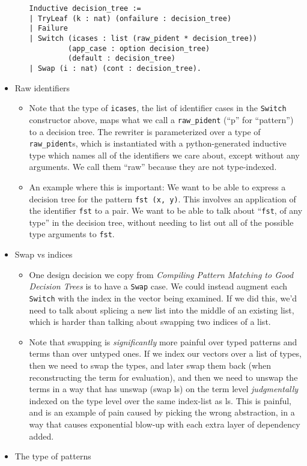 \begin{itemize}
\begin{itemize}
\begin{verbatim}
Inductive decision_tree :=
| TryLeaf (k : nat) (onfailure : decision_tree)
| Failure
| Switch (icases : list (raw_pident * decision_tree))
         (app_case : option decision_tree)
         (default : decision_tree)
| Swap (i : nat) (cont : decision_tree).
\end{verbatim}
  \end{itemize}
\item
  Raw identifiers

  \begin{itemize}
  \tightlist
  \item
    Note that the type of \texttt{icases}, the list of identifier cases
    in the \texttt{Switch} constructor above, maps what we call a
    \texttt{raw\_pident} (``p'' for ``pattern'') to a decision tree. The
    rewriter is parameterized over a type of \texttt{raw\_pident}s,
    which is instantiated with a python-generated inductive type which
    names all of the identifiers we care about, except without any
    arguments. We call them ``raw'' because they are not type-indexed.
  \item
    An example where this is important: We want to be able to express a
    decision tree for the pattern \texttt{fst\ (x,\ y)}. This involves
    an application of the identifier \texttt{fst} to a pair. We want to
    be able to talk about ``\texttt{fst}, of any type'' in the decision
    tree, without needing to list out all of the possible type arguments
    to \texttt{fst}.
  \end{itemize}
\item
  Swap vs indices

  \begin{itemize}
  \tightlist
  \item
    One design decision we copy from \emph{Compiling Pattern Matching to
    Good Decision Trees} is to have a \texttt{Swap} case. We could
    instead augment each \texttt{Switch} with the index in the vector
    being examined. If we did this, we'd need to talk about splicing a
    new list into the middle of an existing list, which is harder than
    talking about swapping two indices of a list.
  \item
    Note that swapping is \emph{significantly} more painful over typed
    patterns and terms than over untyped ones. If we index our vectors
    over a list of types, then we need to swap the types, and later swap
    them back (when reconstructing the term for evaluation), and then we
    need to unswap the terms in a way that has unswap (swap ls) on the
    term level \emph{judgmentally} indexed on the type level over the
    same index-list as ls. This is painful, and is an example of pain
    caused by picking the wrong abstraction, in a way that causes
    exponential blow-up with each extra layer of dependency added.
  \end{itemize}
\item
  The type of patterns


\end{itemize}
